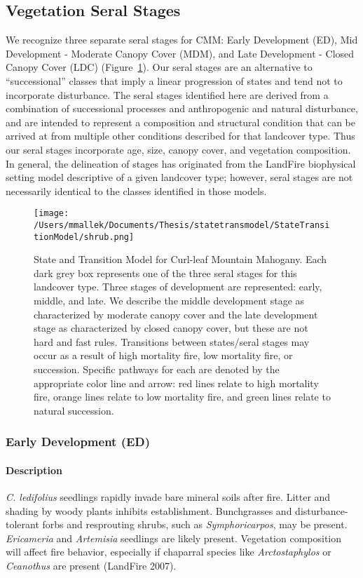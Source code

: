 \subsection*{Vegetation Seral Stages}
We recognize three separate seral stages for CMM: Early Development (ED), Mid Development - Moderate Canopy Cover (MDM), and Late Development - Closed Canopy Cover (LDC) (Figure~\ref{cmm_transmodel}). Our seral stages are an alternative to ``successional'' classes that imply a linear progression of states and tend not to incorporate disturbance. The seral stages identified here are derived from a combination of successional processes and anthropogenic and natural disturbance, and are intended to represent a composition and structural condition that can be arrived at from multiple other conditions described for that landcover type. Thus our seral stages incorporate age, size, canopy cover, and vegetation composition. In general, the delineation of stages has originated from the LandFire biophysical setting model descriptive of a given landcover type; however, seral stages are not necessarily identical to the classes identified in those models.

\begin{figure}[hbt]
\centering
\texttt{[image: /Users/mmallek/Documents/Thesis/statetransmodel/StateTransitionModel/shrub.png]}
\caption{State and Transition Model for Curl-leaf Mountain Mahogany. Each dark grey box represents one of the three seral stages for this landcover type. Three stages of development are represented: early, middle, and late. We describe the middle development stage as characterized by moderate canopy cover and the late development stage as characterized by closed canopy cover, but these are not hard and fast rules. Transitions between states/seral stages may occur as a result of high mortality fire, low mortality fire, or succession. Specific pathways for each are denoted by the appropriate color line and arrow: red lines relate to high mortality fire, orange lines relate to low mortality fire, and green lines relate to natural succession.} 
\label{cmm_transmodel}
\end{figure}

\subsubsection*{Early Development (ED)}

\paragraph*{Description} \emph{C. ledifolius} seedlings rapidly invade bare mineral soils after fire. Litter and shading by woody plants inhibits establishment. Bunchgrasses and disturbance-tolerant forbs and resprouting shrubs, such as \emph{Symphoricarpos}, may be present. \emph{Ericameria} and \emph{Artemisia} seedlings are likely present. Vegetation composition will affect fire behavior, especially if chaparral species like \emph{Arctostaphylos} or \emph{Ceanothus} are present (LandFire 2007).

